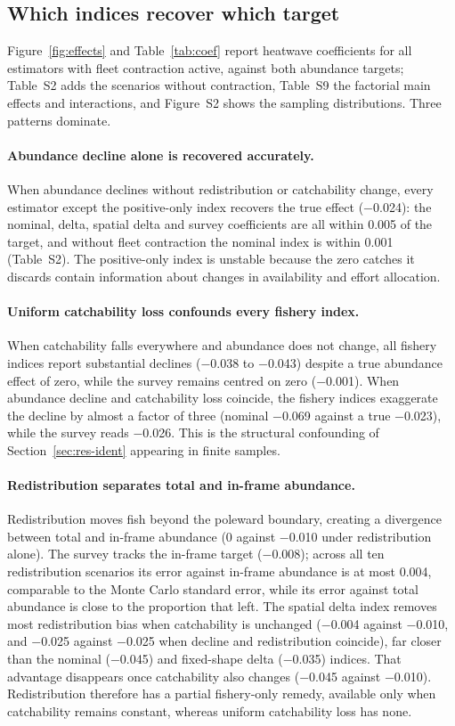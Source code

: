 \documentclass[11pt,a4paper]{article}
\begin{document}
\subsection{Which indices recover which target}
\label{sec:res-factorial}

Figure~\ref{fig:effects} and Table~\ref{tab:coef} report heatwave coefficients for all estimators with fleet contraction active, against both abundance targets; Table~S2 adds the scenarios without contraction, Table~S9 the factorial main effects and interactions, and Figure~S2 shows the sampling distributions. Three patterns dominate.

\paragraph{Abundance decline alone is recovered accurately.} When abundance declines without redistribution or catchability change, every estimator except the positive-only index recovers the true effect ($-$0.024): the nominal, delta, spatial delta and survey coefficients are all within 0.005 of the target, and without fleet contraction the nominal index is within 0.001 (Table~S2). The positive-only index is unstable because the zero catches it discards contain information about changes in availability and effort allocation.

\paragraph{Uniform catchability loss confounds every fishery index.} When catchability falls everywhere and abundance does not change, all fishery indices report substantial declines ($-$0.038 to $-$0.043) despite a true abundance effect of zero, while the survey remains centred on zero ($-$0.001). When abundance decline and catchability loss coincide, the fishery indices exaggerate the decline by almost a factor of three (nominal $-$0.069 against a true $-$0.023), while the survey reads $-$0.026. This is the structural confounding of Section~\ref{sec:res-ident} appearing in finite samples.

\paragraph{Redistribution separates total and in-frame abundance.} Redistribution moves fish beyond the poleward boundary, creating a divergence between total and in-frame abundance (0 against $-$0.010 under redistribution alone). The survey tracks the in-frame target ($-$0.008); across all ten redistribution scenarios its error against in-frame abundance is at most 0.004, comparable to the Monte Carlo standard error, while its error against total abundance is close to the proportion that left. The spatial delta index removes most redistribution bias when catchability is unchanged ($-$0.004 against $-$0.010, and $-$0.025 against $-$0.025 when decline and redistribution coincide), far closer than the nominal ($-$0.045) and fixed-shape delta ($-$0.035) indices. That advantage disappears once catchability also changes ($-$0.045 against $-$0.010). Redistribution therefore has a partial fishery-only remedy, available only when catchability remains constant, whereas uniform catchability loss has none.
\end{document}

